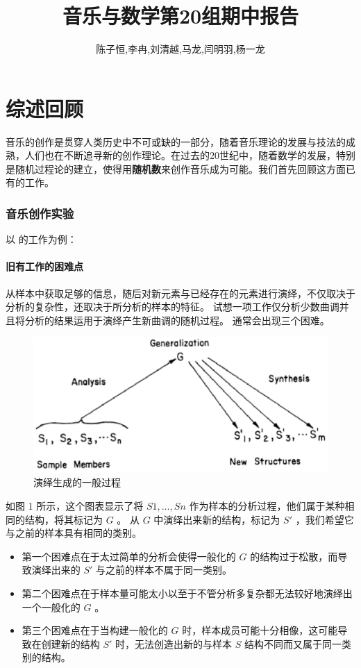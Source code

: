 \documentclass[11pt]{article}
\title{音乐与数学第20组期中报告}
\author{陈子恒,李冉,刘清越,马龙,闫明羽,杨一龙}
\begin{document}
\maketitle

\part{综述回顾}
音乐的创作是贯穿人类历史中不可或缺的一部分，随着音乐理论的发展与技法的成熟，人们也在不断追寻新的创作理论。在过去的20世纪中，随着数学的发展，特别是随机过程论的建立，使得用\textbf{随机数}来创作音乐成为可能。我们首先回顾这方面已有的工作。
\section{音乐创作实验}
以 \cite{5222016} 的工作为例：
\subsection{旧有工作的困难点}
从样本中获取足够的信息，随后对新元素与已经存在的元素进行演绎，不仅取决于分析的复杂性，还取决于所分析的样本的特征。
试想一项工作仅分析少数曲调并且将分析的结果运用于演绎产生新曲调的随机过程。
通常会出现三个困难。
\begin{figure}[hptb]
	\centering
	\label{fig:1.1.1}
	\includegraphics[width=\textwidth]{pic/1.1.1.eps}
	\caption{演绎生成的一般过程}
\end{figure}	
如图 1 所示，这个图表显示了将 $S1, \dots, Sn$ 作为样本的分析过程，他们属于某种相同的结构，将其标记为 $G$ 。
从 $G$ 中演绎出来新的结构，标记为 $S'$ ，我们希望它与之前的样本具有相同的类别。
\begin{itemize}
\item 第一个困难点在于太过简单的分析会使得一般化的 $G$ 的结构过于松散，而导致演绎出来的 $S'$ 与之前的样本不属于同一类别。
\item 第二个困难点在于样本量可能太小以至于不管分析多复杂都无法较好地演绎出一个一般化的 $G$ 。
\item 第三个困难点在于当构建一般化的 $G$ 时，样本成员可能十分相像，这可能导致在创建新的结构 $S'$ 时，无法创造出新的与样本 $S$ 结构不同而又属于同一类别的结构。
\end{itemize} 
\end{document}
